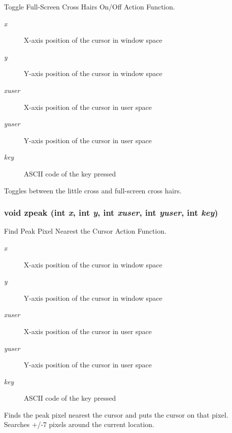 Toggle Full-Screen Cross Hairs On/Off Action Function. 

\begin{Desc}
\item[Parameters:]
\begin{description}
\item[{\em x}]X-axis position of the cursor in window space \item[{\em y}]Y-axis position of the cursor in window space \item[{\em xuser}]X-axis position of the cursor in user space \item[{\em yuser}]Y-axis position of the cursor in user space \item[{\em key}]ASCII code of the key pressed\end{description}
\end{Desc}
Toggles between the little cross and full-screen cross hairs. 
\subsubsection{\setlength{\rightskip}{0pt plus 5cm}void zpeak (int {\em x}, int {\em y}, int {\em xuser}, int {\em yuser}, int {\em key})}\label{xtvutils_8c_a219}


Find Peak Pixel Nearest the Cursor Action Function. 

\begin{Desc}
\item[Parameters:]
\begin{description}
\item[{\em x}]X-axis position of the cursor in window space \item[{\em y}]Y-axis position of the cursor in window space \item[{\em xuser}]X-axis position of the cursor in user space \item[{\em yuser}]Y-axis position of the cursor in user space \item[{\em key}]ASCII code of the key pressed\end{description}
\end{Desc}
Finds the peak pixel nearest the cursor and puts the cursor on that pixel. Searches +/-7 pixels around the current location. 